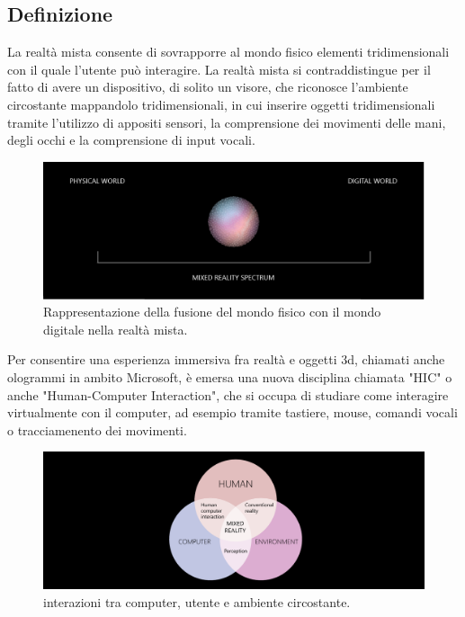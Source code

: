\subsection{Definizione}
La realtà mista consente di sovrapporre al mondo fisico elementi tridimensionali con il quale l'utente può interagire. La realtà mista si contraddistingue per il fatto di avere un dispositivo, di solito un visore, che riconosce l'ambiente circostante mappandolo tridimensionali, in cui inserire oggetti tridimensionali tramite l'utilizzo di appositi sensori, la comprensione dei movimenti delle mani, degli occhi e la comprensione di input vocali.
\begin{figure}[H]
    \includegraphics[scale=0.4]{figures/chapter_1/mixedrealityspectrum-worlds.png}
    \caption{Rappresentazione della fusione del mondo fisico con il mondo digitale nella realtà mista.}
    \centering
\end{figure}

Per consentire una esperienza immersiva fra realtà e oggetti 3d, chiamati anche ologrammi in ambito Microsoft, è emersa una nuova disciplina chiamata "HIC" o anche "Human-Computer Interaction", che si occupa di studiare come interagire virtualmente con il computer, ad esempio tramite tastiere, mouse, comandi vocali o tracciamenento dei movimenti. \cite{MixedRealityDefinition}

\begin{figure}[H]
    \includegraphics[scale=0.4]{figures/chapter_1/mixed-reality-venn-diagram.png}
    \caption{interazioni tra computer, utente e ambiente circostante.}
    \centering
\end{figure}
    

